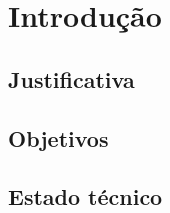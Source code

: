 \chapter[Introdução]{Introdução}

\section{Justificativa}
\section{Objetivos}
\section{Estado técnico}